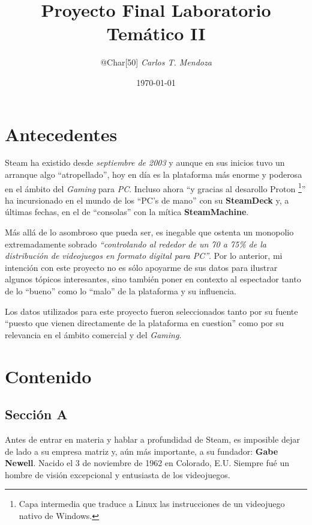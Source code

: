 \documentclass[letterpaper, 11pt]{article}
\title{Proyecto Final Laboratorio Temático II}
\author{@Char[50] \textit{Carlos T. Mendoza}}
\date{\today}
\begin{document}
\maketitle
\tableofcontents

\newpage
\section{Antecedentes}
    Steam ha existido desde \textit{septiembre de 2003} y aunque en sus inicios tuvo un arranque algo \enquote{atropellado}, hoy en día es la plataforma más enorme y poderosa en el ámbito del \textit{Gaming} para \textit{PC}. Incluso ahora \enquote{y gracias al desarollo Proton \footnote{Capa intermedia que traduce a Linux las instrucciones de un videojuego nativo de Windows.}} ha incursionado en el mundo de los \enquote{PC's de mano} con su \textbf{SteamDeck} y, a últimas fechas, en el de \enquote{consolas} con la mítica \textbf{SteamMachine}. 

    Más allá de lo asombroso que pueda ser, es inegable que ostenta un monopolio extremadamente sobrado \textit{\enquote{controlando al rededor de un 70 a 75\% de la distribución de videojuegos en formato digital para PC}}. Por lo anterior, mi intención con este proyecto no es sólo apoyarme de sus datos para ilustrar algunos tópicos interesantes, sino también poner en contexto al espectador tanto de lo \enquote{bueno} como lo \enquote{malo} de la plataforma y su influencia. 

    Los datos utilizados para este proyecto fueron seleccionados tanto por su fuente \enquote{puesto que vienen directamente de la plataforma en cuestion} como por su relevancia en el ámbito comercial y del \textit{Gaming}. 


\section{Contenido}
    \subsection{Sección A} %
    Antes de entrar en materia y hablar a profundidad de Steam, es imposible dejar de lado a su empresa matriz y, aún más importante, a su fundador: \textbf{Gabe Newell}. Nacido el 3 de noviembre de 1962 en Colorado, E.U. Siempre fué un hombre de visión excepcional y entusiasta de los videojuegos. 

\vspace{0.5cm}
\end{document}
